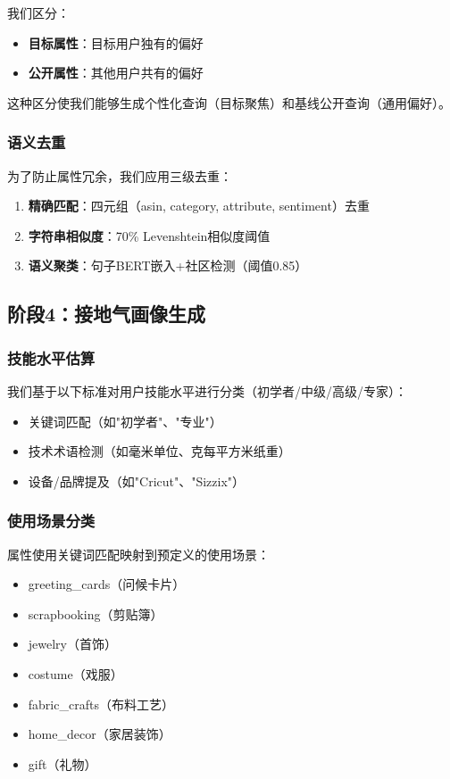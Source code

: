 \documentclass[11pt,a4paper]{article}
\begin{document}
我们区分：
\begin{itemize}
    \item \textbf{目标属性}：目标用户独有的偏好
    \item \textbf{公开属性}：其他用户共有的偏好
\end{itemize}

这种区分使我们能够生成个性化查询（目标聚焦）和基线公开查询（通用偏好）。

\subsubsection{语义去重}

为了防止属性冗余，我们应用三级去重：
\begin{enumerate}
    \item \textbf{精确匹配}：四元组（asin, category, attribute, sentiment）去重
    \item \textbf{字符串相似度}：70\% Levenshtein相似度阈值
    \item \textbf{语义聚类}：句子BERT嵌入+社区检测（阈值0.85）
\end{enumerate}

\subsection{阶段4：接地气画像生成}

\subsubsection{技能水平估算}

我们基于以下标准对用户技能水平进行分类（初学者/中级/高级/专家）：
\begin{itemize}
    \item 关键词匹配（如"初学者"、"专业"）
    \item 技术术语检测（如毫米单位、克每平方米纸重）
    \item 设备/品牌提及（如"Cricut"、"Sizzix"）
\end{itemize}

\subsubsection{使用场景分类}

属性使用关键词匹配映射到预定义的使用场景：
\begin{itemize}
    \item greeting\_cards（问候卡片）
    \item scrapbooking（剪贴簿）
    \item jewelry（首饰）
    \item costume（戏服）
    \item fabric\_crafts（布料工艺）
    \item home\_decor（家居装饰）
    \item gift（礼物）
\end{itemize}
\end{document}
